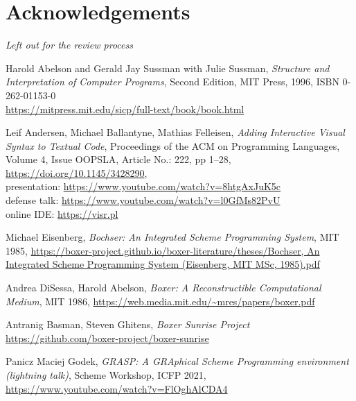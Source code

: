\documentclass[acmsmall]{acmart}
\begin{document}
\section*{Acknowledgements}

\textit{Left out for the review process}


\begin{thebibliography}{8}

  Harold Abelson and Gerald Jay Sussman with Julie Sussman,
  \emph{Structure and Interpretation of Computer Programs},
  Second Edition, MIT Press, 1996, ISBN 0-262-01153-0 \\
  \url{https://mitpress.mit.edu/sicp/full-text/book/book.html}
  
  Leif Andersen, Michael Ballantyne, Mathias Felleisen,
  \emph{Adding Interactive Visual Syntax to Textual Code},
  Proceedings of the ACM on Programming Languages, Volume 4, Issue OOPSLA,
  Article No.: 222, pp 1–28, \url{https://doi.org/10.1145/3428290}, \\
  presentation: \url{https://www.youtube.com/watch?v=8htgAxJuK5c} \\ 
  defense talk: \url{https://www.youtube.com/watch?v=l0GfMs82PvU} \\
  online IDE: \url{https://visr.pl}

  Michael Eisenberg, \emph{Bochser: An Integrated Scheme Programming System},
  MIT 1985, \url{https://boxer-project.github.io/boxer-literature/theses/Bochser, An Integrated Scheme Programming System (Eisenberg, MIT MSc, 1985).pdf}
  
  Andrea DiSessa, Harold Abelson,
  \emph{Boxer: A Reconstructible Computational Medium},
  MIT 1986, \url{https://web.media.mit.edu/~mres/papers/boxer.pdf}

  Antranig Basman, Steven Ghitens, \emph{Boxer Sunrise Project} \\
  \url{https://github.com/boxer-project/boxer-sunrise}

 Panicz Maciej Godek, \emph{GRASP: A GRAphical
Scheme Programming environment (lightning talk)}, Scheme Workshop,
  ICFP 2021, \url{https://www.youtube.com/watch?v=FlOghAlCDA4}
  

\end{thebibliography}
\end{document}
